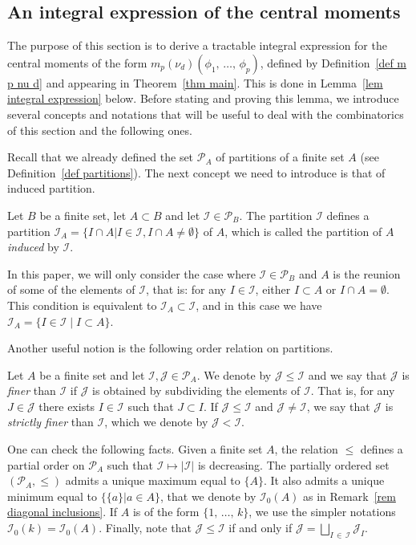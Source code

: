\documentclass[AHL,Unicode,longabstracts,published]{cedram}
\newcommand{\I}{\mathcal{I}}
\newcommand{\J}{\mathcal{J}}
\newcommand{\pa}{\mathcal{P}\!}
\renewcommand{\leq}{\leqslant}
\begin{document}
\subsection{An integral expression of the central moments}\label{subsec an integral expression of the central moments}

The purpose of this section is to derive a tractable integral expression for the central moments of the form $m_p(\nu_d)(\phi_1,\,\dots,\,\phi_p)$, defined by Definition~\ref{def m p nu d} and appearing in Theorem~\ref{thm main}. This is done in Lemma~\ref{lem integral expression} below. Before stating and proving this lemma, we introduce several concepts and notations that will be useful to deal with the combinatorics of this section and the following ones.

Recall that we already defined the set $\pa_A$ of partitions of a finite set $A$ (see Definition~\ref{def partitions}). The next concept we need to introduce is that of induced partition.

\begin{defi}\label{def induced partition}
Let $B$ be a finite set, let $A \subset B$ and let $\I \in \pa_B$. The partition $\I$ defines a partition $\I_A = \{ I \cap A \vert I \in \I, I \cap A \neq \emptyset \}$ of $A$, which is called the partition of $A$ \emph{induced} by $\I$.
\end{defi}

In this paper, we will only consider the case where $\I \in \pa_B$ and $A$ is the reunion of some of the elements of $\I$, that is: for any $I \in \I$, either $I \subset A$ or $I \cap A = \emptyset$. This condition is equivalent to $\I_A \subset \I$, and in this case we have $\I_A = \{I \in \I \mid I \subset A\}$.

Another useful notion is the following order relation on partitions.

\begin{defi}\label{def order on partitions}
Let $A$ be a finite set and let $\I,\J \in \pa_A$. We denote by $\J \leq \I$ and we say that $\J$ is \emph{finer} than $\I$ if $\J$ is obtained by subdividing the elements of $\I$. That is, for any $J \in \J$ there exists $I \in \I$ such that $J \subset I$. If $\J \leq \I$ and $\J \neq \I$, we say that $\J$ is \emph{strictly finer} than $\I$, which we denote by $\J < \I$.
\end{defi}

One can check the following facts. Given a finite set $A$, the relation $\leq$ defines a partial order on $\pa_A$ such that $\I \mapsto |\I|$ is decreasing. The partially ordered set $(\pa_A,\leq )$ admits a unique maximum equal to $\{A\}$. It also admits a unique minimum equal to $\{ \{a\} \vert a \in A \}$, that we denote by $\I_0(A)$ as in Remark~\ref{rem diagonal inclusions}. If $A$ is of the form $\{1,\,\dots,\,k\}$, we use the simpler notations $\I_0(k)=\I_0(A)$. Finally, note that $\J \leq \I$ if and only if $\J = \bigsqcup_{I\,\in\,\I} \J_I$.
\end{document}
